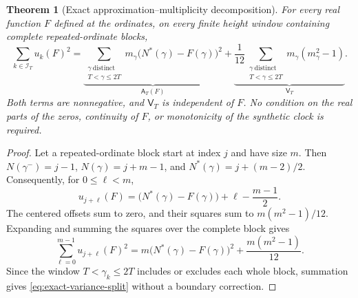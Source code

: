 \documentclass[11pt,reqno]{amsart}
\numberwithin{equation}{section}
\newtheorem{theorem}{Theorem}[section]
\begin{document}
\begin{theorem}[Exact approximation--multiplicity decomposition]
\label{thm:exact-variance-split}
For every real function $F$ defined at the ordinates, on every finite
height window containing complete repeated-ordinate blocks,
\begin{equation}\label{eq:exact-variance-split}
 \boxed{\displaystyle
 \sum_{k\in\mathcal I_T}u_k(F)^2
 = \underbrace{\sum_{\substack{\gamma\ \mathrm{distinct}\\T<\gamma\le2T}}
 m_\gamma\bigl(N^*(\gamma)-F(\gamma)\bigr)^2}_{\mathsf A_T(F)}
 +\underbrace{\frac1{12}\sum_{\substack{\gamma\ \mathrm{distinct}\\T<\gamma\le2T}}
 m_\gamma(m_\gamma^2-1)}_{\mathsf V_T}. }
\end{equation}
Both terms are nonnegative, and $\mathsf V_T$ is independent of $F$.
No condition on the real parts of the zeros, continuity of $F$, or
monotonicity of the synthetic clock is required.
\end{theorem}
\begin{proof}
Let a repeated-ordinate block start at index $j$ and have size $m$.
Then $N(\gamma^-)=j-1$, $N(\gamma)=j+m-1$, and
$N^*(\gamma)=j+(m-2)/2$.  Consequently, for
$0\le\ell<m$,
\[
 u_{j+\ell}(F)=\bigl(N^*(\gamma)-F(\gamma)\bigr)
       +\ell-\frac{m-1}{2}.
\]
The centered offsets sum to zero, and their squares sum to
$m(m^2-1)/12$.  Expanding and summing the squares over the
complete block gives
\[
 \sum_{\ell=0}^{m-1}u_{j+\ell}(F)^2
 =m\bigl(N^*(\gamma)-F(\gamma)\bigr)^2
  +\frac{m(m^2-1)}{12}.
\]
Since the window $T<\gamma_k\le2T$ includes or excludes each
whole block, summation gives \eqref{eq:exact-variance-split}
without a boundary correction.
\end{proof}
\end{document}
